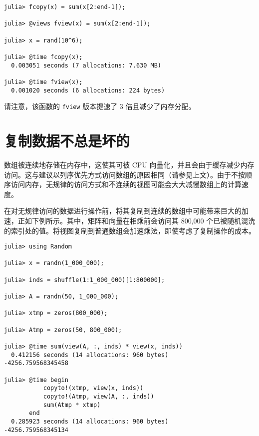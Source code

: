 \begin{verbatim}
julia> fcopy(x) = sum(x[2:end-1]);

julia> @views fview(x) = sum(x[2:end-1]);

julia> x = rand(10^6);

julia> @time fcopy(x);
  0.003051 seconds (7 allocations: 7.630 MB)

julia> @time fview(x);
  0.001020 seconds (6 allocations: 224 bytes)
\end{verbatim}



请注意，该函数的 \texttt{fview} 版本提速了 3 倍且减少了内存分配。



\hypertarget{12328390677917528950}{}


\section{复制数据不总是坏的}



数组被连续地存储在内存中，这使其可被 CPU 向量化，并且会由于缓存减少内存访问。这与建议以列序优先方式访问数组的原因相同（请参见上文）。由于不按顺序访问内存，无规律的访问方式和不连续的视图可能会大大减慢数组上的计算速度。



在对无规律访问的数据进行操作前，将其复制到连续的数组中可能带来巨大的加速，正如下例所示。其中，矩阵和向量在相乘前会访问其 800,000 个已被随机混洗的索引处的值。将视图复制到普通数组会加速乘法，即使考虑了复制操作的成本。




\begin{verbatim}
julia> using Random

julia> x = randn(1_000_000);

julia> inds = shuffle(1:1_000_000)[1:800000];

julia> A = randn(50, 1_000_000);

julia> xtmp = zeros(800_000);

julia> Atmp = zeros(50, 800_000);

julia> @time sum(view(A, :, inds) * view(x, inds))
  0.412156 seconds (14 allocations: 960 bytes)
-4256.759568345458

julia> @time begin
           copyto!(xtmp, view(x, inds))
           copyto!(Atmp, view(A, :, inds))
           sum(Atmp * xtmp)
       end
  0.285923 seconds (14 allocations: 960 bytes)
-4256.759568345134
\end{verbatim}



